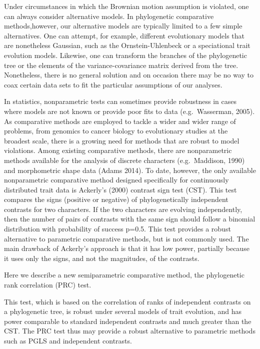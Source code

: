 \documentclass[fleqn,10pt,lineno]{wlpeerj} %
\begin{document}
Under circumstances in which the Brownian motion assumption is violated, one can always consider alternative models. In phylogenetic comparative methods,however, our alternative models are typically limited to a few simple alternatives. One can attempt, for example, different evolutionary models that are nonetheless Gaussian, such as the Ornstein-Uhlenbeck or a speciational trait evolution models. Likewise, one can transform the branches of the phylogenetic tree or the elements of the variance-covariance matrix derived from the tree. Nonetheless, there is no general solution and on occasion there may be no way to coax certain data sets to fit the particular assumptions of our analyses.

In statistics, nonparametric tests can sometimes provide robustness in cases where models are not known or provide poor fits to data (e.g.~Wasserman, 2005). As comparative methods are employed to tackle a wider and wider range of problems, from genomics to cancer biology to evolutionary studies at the broadest scale, there is a growing need for methods that are robust to model violations. Among existing comparative methods, there are nonparametric methods available for the analysis of discrete characters (e.g.~Maddison, 1990) and morphometric shape data (Adams 2014). To date, however, the only available nonparametric comparative method designed specifically for continuously distributed trait data is Ackerly's (2000) contrast sign test (CST). This test compares the signs (positive or negative) of phylogenetically independent contrasts for two characters. If the two characters are evolving independently, then the number of pairs of contrasts with the same sign should follow a binomial distribution with probability of success p=0.5. This test provides a robust alternative to parametric comparative methods, but is not commonly used. The main drawback of Ackerly's approach is that it has low power, partially because it uses only the signs, and not the magnitudes, of the contrasts.

Here we describe a new semiparametric comparative method, the phylogenetic rank correlation (PRC) test.

This test, which is based on the correlation of ranks of independent contrasts on a phylogenetic tree, is robust under several models of trait evolution, and has power comparable to standard independent contrasts and much greater than the CST. The PRC test thus may provide a robust alternative to parametric methods such as PGLS and independent contrasts.
\end{document}
